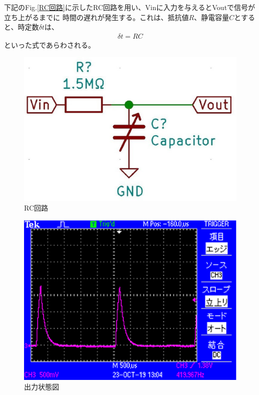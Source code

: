 下記のFig.\ref{RC回路}に示したRC回路を用い、Vinに入力を与えるとVoutで信号が立ち上がるまでに
時間の遅れが発生する。これは、抵抗値$R$、静電容量$C$とすると、時定数$\delta t$は、
\begin{eqnarray}
    \delta t = RC
\end{eqnarray}
といった式であらわされる。

\begin{figure}[h]
 \begin{center}
  \includegraphics[width=0.5\columnwidth,clip]{./2_measurement/RC.eps}
  \caption{RC回路}
  \label{RC}
 \end{center}
\end{figure}

\begin{figure}[h]
    \begin{center}
     \includegraphics[width=0.5\columnwidth,clip]{./2_measurement/オシロスコープ.eps}
     \caption{出力状態図}
     \label{オシロスコープ}
    \end{center}
\end{figure}


